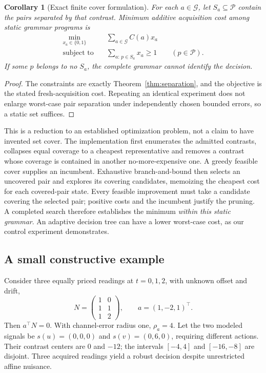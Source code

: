 \documentclass[11pt,letterpaper]{article}
\newtheorem{corollary}[theorem]{Corollary}
\theoremstyle{definition}\newtheorem{definition}[theorem]{Definition}
\theoremstyle{remark}\newtheorem{remark}[theorem]{Remark}
\newcommand{\G}{\mathcal G}
\newcommand{\Pairs}{\mathcal P}
\begin{document}
\begin{corollary}[Exact finite cover formulation]
\label{cor:cover}
For each \(a\in\G\), let \(S_a\subseteq\Pairs\) contain the pairs separated by that contrast. Minimum additive acquisition cost among static grammar programs is
\begin{align}
 \min_{x_a\in\{0,1\}} \quad & \sum_{a\in\G} C(a)x_a \label{eq:cover}\\
 \text{subject to}\quad&
 \sum_{a:\,p\in S_a}x_a\geq1 \qquad(p\in\Pairs). \nonumber
\end{align}
If some \(p\) belongs to no \(S_a\), the complete grammar cannot identify the decision.
\end{corollary}
\begin{proof}
The constraints are exactly Theorem~\ref{thm:separation}, and the objective is the stated fresh-acquisition cost. Repeating an identical experiment does not enlarge worst-case pair separation under independently chosen bounded errors, so a static set suffices.
\end{proof}

This is a reduction to an established optimization problem, not a claim to have invented set cover. The implementation first enumerates the admitted contrasts, collapses equal coverage to a cheapest representative and removes a contrast whose coverage is contained in another no-more-expensive one. A greedy feasible cover supplies an incumbent. Exhaustive branch-and-bound then selects an uncovered pair and explores its covering candidates, memoizing the cheapest cost for each covered-pair state. Every feasible improvement must take a candidate covering the selected pair; positive costs and the incumbent justify the pruning. A completed search therefore establishes the minimum \emph{within this static grammar}. An adaptive decision tree can have a lower worst-case cost, as our control experiment demonstrates.

\subsection{A small constructive example}
Consider three equally priced readings at \(t=0,1,2\), with unknown offset and drift,
\[
 N=\begin{pmatrix}1&0\\1&1\\1&2\end{pmatrix},
 \qquad a=(1,-2,1)^\top.
\]
Then \(a^\top N=0\). With channel-error radius one, \(\rho_a=4\). Let the two modeled signals be \(s(u)=(0,0,0)\) and \(s(v)=(0,6,0)\), requiring different actions. Their contrast centers are \(0\) and \(-12\); the intervals \([-4,4]\) and \([-16,-8]\) are disjoint. Three acquired readings yield a robust decision despite unrestricted affine nuisance.
\end{document}

